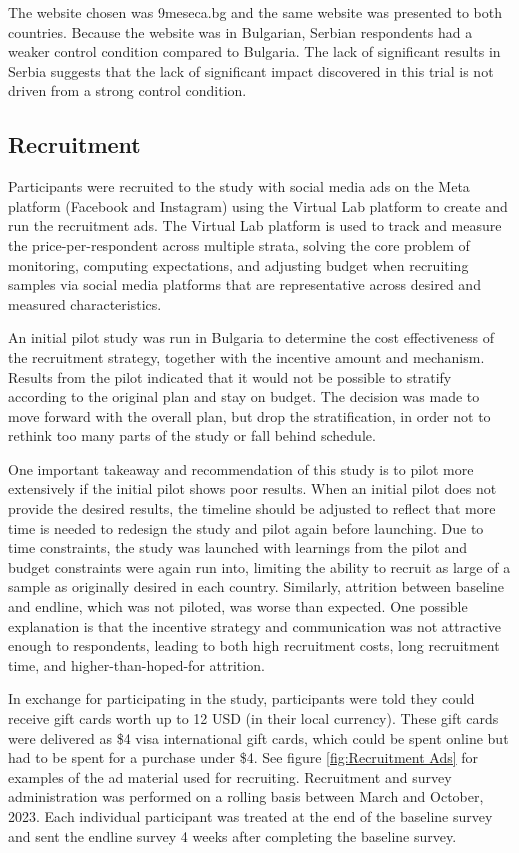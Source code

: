 \documentclass{article}
\begin{document}
The website chosen was 9meseca.bg and the same website was presented to both countries. Because the website was in Bulgarian, Serbian respondents had a weaker control condition compared to Bulgaria. The lack of significant results in Serbia suggests that the lack of significant impact discovered in this trial is not driven from a strong control condition.

\subsection*{Recruitment}

Participants were recruited to the study with social media ads on the Meta platform (Facebook and Instagram) using the Virtual Lab platform to create and run the recruitment ads. The Virtual Lab platform is used to track and measure the price-per-respondent across multiple strata, solving the core problem of monitoring, computing expectations, and adjusting budget when recruiting samples via social media platforms that are representative across desired and measured characteristics.

An initial pilot study was run in Bulgaria to determine the cost effectiveness of the recruitment strategy, together with the incentive amount and mechanism. Results from the pilot indicated that it would not be possible to stratify according to the original plan and stay on budget. The decision was made to move forward with the overall plan, but drop the stratification, in order not to rethink too many parts of the study or fall behind schedule.

One important takeaway and recommendation of this study is to pilot more extensively if the initial pilot shows poor results. When an initial pilot does not provide the desired results, the timeline should be adjusted to reflect that more time is needed to redesign the study and pilot again before launching. Due to time constraints, the study was launched with learnings from the pilot and budget constraints were again run into, limiting the ability to recruit as large of a sample as originally desired in each country. Similarly, attrition between baseline and endline, which was not piloted, was worse than expected. One possible explanation is that the incentive strategy and communication was not attractive enough to respondents, leading to both high recruitment costs, long recruitment time, and higher-than-hoped-for attrition.

In exchange for participating in the study, participants were told they could receive gift cards worth up to 12 USD (in their local currency). These gift cards were delivered as \$4 visa international gift cards, which could be spent online but had to be spent for a purchase under \$4. See figure \ref{fig:Recruitment Ads} for examples of the ad material used for recruiting. Recruitment and survey administration was performed on a rolling basis between March and October, 2023. Each individual participant was treated at the end of the baseline survey and sent the endline survey 4 weeks after completing the baseline survey.
\end{document}
